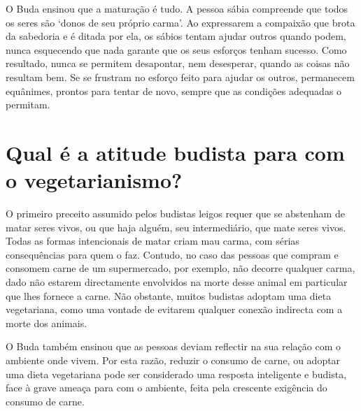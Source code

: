 O Buda ensinou que a maturação é tudo. A pessoa sábia compreende que
todos os seres são `donos de seu próprio carma'. Ao expressarem a
compaixão que brota da sabedoria e é ditada por ela, os sábios tentam
ajudar outros quando podem, nunca esquecendo que nada garante que os
seus esforços tenham sucesso. Como resultado, nunca se permitem
desapontar, nem desesperar, quando as coisas não resultam bem. Se se
frustram no esforço feito para ajudar os outros, permanecem equânimes,
prontos para tentar de novo, sempre que as condições adequadas o
permitam.

\section{Qual é a atitude budista para com o vegetarianismo?}

O primeiro preceito assumido pelos budistas leigos requer que se
abstenham de matar seres vivos, ou que haja alguém, seu intermediário,
que mate seres vivos. Todas as formas intencionais de matar criam mau
carma, com sérias consequências para quem o faz. Contudo, no caso das
pessoas que compram e consomem carne de um supermercado, por exemplo,
não decorre qualquer carma, dado não estarem directamente envolvidos na
morte desse animal em particular que lhes fornece a carne. Não obstante,
muitos budistas adoptam uma dieta vegetariana, como uma vontade de
evitarem qualquer conexão indirecta com a morte dos animais.

O Buda também ensinou que as pessoas deviam reflectir na sua relação com
o ambiente onde vivem. Por esta razão, reduzir o consumo de carne, ou
adoptar uma dieta vegetariana pode ser considerado uma resposta
inteligente e budista, face à grave ameaça para com o ambiente, feita
pela crescente exigência do consumo de carne.
